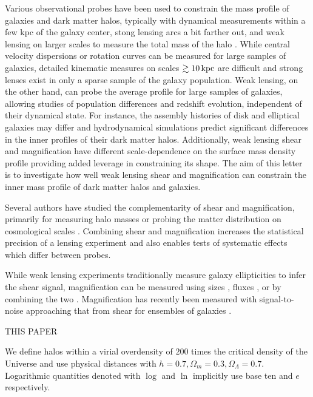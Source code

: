 \documentclass[12pt]{emulateapj}
\begin{document}
Various observational probes have been used to constrain the mass
profile of galaxies and dark matter halos, typically with dynamical
measurements within a few kpc of the galaxy center, stong lensing arcs
a bit farther out, and weak lensing on larger scales to measure the
total mass of the halo \citep[e.g.,][]{Sand2004, Koopmans2006,
  Gavazzi2007, Jiang2007, Auger2010, Schulz2010, Newman2013a}.  While
central velocity dispersions or rotation curves can be measured for
large samples of galaxies, detailed kinematic measures on scales
$\gtrsim10\,{\rm kpc}$ are difficult and strong lenses exist in only a sparse
sample of the galaxy population. Weak lensing, on the other hand, can
probe the average profile for large samples of galaxies, allowing
studies of population differences and redshift evolution, independent
of their dynamical state. For instance, the assembly histories of disk
and elliptical galaxies may differ and hydrodynamical simulations
predict significant differences in the inner profiles of their dark
matter halos. Additionally, weak lensing shear and magnification have
different scale-dependence on the surface mass density profile
providing added leverage in constraining its shape. The aim of this
letter is to investigate how well weak lensing shear and magnification
can constrain the inner mass profile of dark matter halos and
galaxies.

Several authors have studied the complementarity of shear and
magnification, primarily for measuring halo masses
\citep{Bartelmann1996, Bridle1998, Schneider2000, vanWaerbeke2010b,
  Rozo2010, Umetsu2011} or probing the matter distribution on
cosmological scales \citep{vanWaerbeke2010a, Casaponsa2013,
  Duncan2013, Krause2013}. Combining shear and magnification increases
the statistical precision of a lensing experiment and also enables
tests of systematic effects which differ between probes.

While weak lensing experiments traditionally measure galaxy
ellipticities to infer the shear signal, magnification can be measured
using sizes \citep{Bartelmann1995}, fluxes \citep{Broadhurst1995}, or
by combining the two \citep{Huff2011, Schmidt2012}. Magnification has
recently been measured with signal-to-noise approaching that from
shear for ensembles of galaxies \citep{Scranton2005, Hildebrandt2009,
  Menard2010, Huff2011, Ford2012, Schmidt2012}.

THIS PAPER

We define halos within a virial overdensity of $200$ times the
critical density of the Universe and use physical distances with
$h=0.7, \Omega_m=0.3, \Omega_\Lambda=0.7$. Logarithmic quantities
denoted with $\log$ and $\ln$ implicitly use base ten and $e$ respectively.
\end{document}
